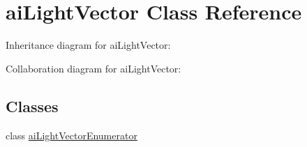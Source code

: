 \hypertarget{classai_light_vector}{\section{ai\+Light\+Vector Class Reference}
\label{classai_light_vector}
}


Inheritance diagram for ai\+Light\+Vector\+:


Collaboration diagram for ai\+Light\+Vector\+:
\subsection*{Classes}
\begin{DoxyCompactItemize}
\item 
class \hyperlink{classai_light_vector_1_1ai_light_vector_enumerator}{ai\+Light\+Vector\+Enumerator}
\end{DoxyCompactItemize}
